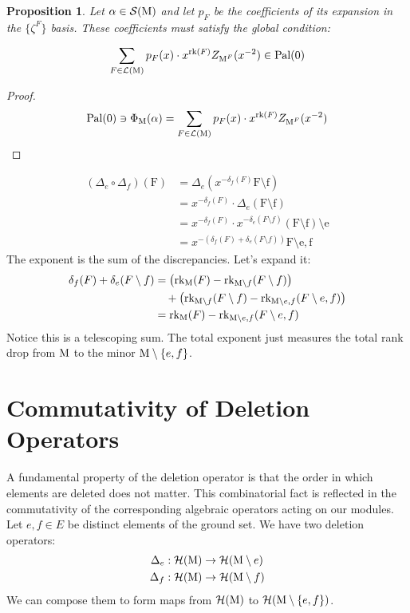 \documentclass[11pt]{article}
\newcommand{\calH}{\mathcal{H}}
\newcommand{\calS}{\mathcal{S}}
\newcommand{\rank}{\normalfont\text{rk}}
\newcommand{\M}{\normalfont\text{M}}
\newcommand{\Ebasis}[1]{\mathrm{#1}}
\newcommand{\Zbasis}[1]{\zeta^{#1}}
\newcommand{\pal}{\normalfont\text{Pal}}
\newtheorem{proposition}[theorem]{Proposition}
\theoremstyle{remark}
\begin{document}
\begin{proposition}
    Let \(\alpha \in \calS(\M)\) and let \(p_F\) be the coefficients of its expansion in the
    \(\{\Zbasis{F}\}\) basis. These coefficients must satisfy the global condition:

    \[ \sum_{F \in \mathcal{L}(\M)} p_F(x) \cdot x^{\rank(F)} Z_{\M^F}(x^{-2}) \in \pal(0) \]
\end{proposition}
\begin{proof}
    \[\pal(0) \ni \Phi_{\M}(\alpha) = \sum_{F \in \mathcal{L}(\M)} p_F(x) \cdot x^{\rank(F)} Z_{\M^F}(x^{-2}) \]
\end{proof}
\begin{align*}
    (\Delta_e \circ \Delta_f)(\Ebasis{F}) & = \Delta_e(x^{-\delta_f(F)} \Ebasis{F \setminus f})                                        \\
                                          & = x^{-\delta_f(F)} \cdot \Delta_e(\Ebasis{F \setminus f})                                  \\
                                          & = x^{-\delta_f(F)} \cdot x^{-\delta_e(F \setminus f)} \Ebasis{(F \setminus f) \setminus e} \\
                                          & = x^{-(\delta_f(F) + \delta_e(F \setminus f))} \Ebasis{F \setminus {e,f}}
\end{align*}
The exponent is the sum of the discrepancies. Let's expand it:
\begin{align*}
    \delta_f(F) + \delta_e(F \setminus f) & = \left(\rank_{\M}(F) - \rank_{\M\setminus f}(F \setminus f)\right)                                     \\
                                          & \quad + \left(\rank_{\M\setminus f}(F \setminus f) - \rank_{\M\setminus{e,f}}(F \setminus {e,f})\right) \\
                                          & = \rank_{\M}(F) - \rank_{\M\setminus{e,f}}(F \setminus {e,f})
\end{align*}
Notice this is a telescoping sum. The total exponent just measures the total rank drop from $\M$ to the minor $\M \setminus \{e,f\}$.

\section{Commutativity of Deletion Operators}

A fundamental property of the deletion operator is that the order in which elements are deleted does not matter. This combinatorial fact is reflected in the commutativity of the corresponding algebraic operators acting on our modules. Let \(e, f \in E\) be distinct elements of the ground set. We have two deletion operators:
\begin{align*}
    \Delta_e & : \calH(\M) \to \calH(\M \setminus e) \\
    \Delta_f & : \calH(\M) \to \calH(\M \setminus f)
\end{align*}
We can compose them to form maps from \(\calH(\M)\) to \(\calH(\M \setminus \{e,f\})\).
\end{document}
